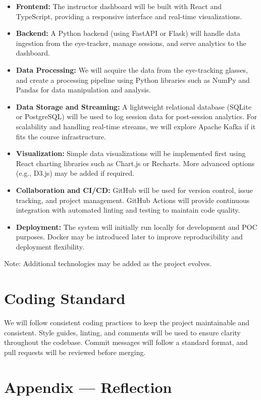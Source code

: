 \documentclass{article}
\begin{document}
\begin{itemize}
  \item \textbf{Frontend:} The instructor dashboard will be built with React and
  TypeScript, providing a responsive interface and real-time visualizations.
  \item \textbf{Backend:} A Python backend (using FastAPI or Flask) will handle
  data ingestion from the eye-tracker, manage sessions, and serve analytics to
  the dashboard.
  \item \textbf{Data Processing:} We will acquire the data from the eye-tracking glasses, and create a processing pipeline using Python libraries such as NumPy and Pandas for data manipulation and analysis.
  \item \textbf{Data Storage and Streaming:} A lightweight relational database (SQLite or PostgreSQL) will be used to log session data for post-session analytics. For scalability and handling real-time streams, we will explore Apache Kafka if it fits the course infrastructure.
  \item \textbf{Visualization:} Simple data visualizations will be implemented first using React charting libraries such as Chart.js or Recharts. More advanced options (e.g., D3.js) may be added if required.
  \item \textbf{Collaboration and CI/CD:} GitHub will be used for version control, issue tracking, and project management. GitHub Actions will provide continuous integration with automated linting and testing to maintain code quality.
  \item \textbf{Deployment:} The system will initially run locally for development and POC purposes. Docker may be introduced later to improve reproducibility and deployment flexibility.
\end{itemize}

Note: Additional technologies may be added as the project evolves.
\section{Coding Standard}

We will follow consistent coding practices to keep the project maintainable and consistent. Style guides, linting, and comments will be used to ensure clarity throughout the codebase. Commit messages will follow a standard format, and pull requests will be reviewed before merging.

\newpage{}

\section*{Appendix --- Reflection}
\end{document}
